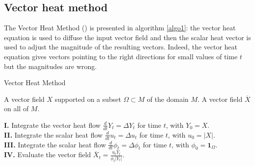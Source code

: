 \documentclass[sigconf, nonacm]{acmart}
\begin{document}
\subsection{Vector heat method}
The Vector Heat Method (\cite{Sharp:2019:VHM}) is presented in algorithm \ref{algo1}: the vector heat equation is used to diffuse the input vector field and then the scalar heat vector is used to adjust the magnitude of the resulting vectors. Indeed, the vector heat equation gives vectors pointing to the right directions for small values of time $t$ but the magnitudes are wrong. 

\begin{algorithm}
\caption{Vector Heat Method} \label{algo1}
\begin{algorithmic}
\Require A vector field $X$ supported on a subset $\Omega \subset M$ of the domain $M$.
\Ensure A vector field $\overline{X}$ on all of $M$.

\noindent \textbf{I.} Integrate the vector heat flow $\frac{d}{dt} Y_t = \Delta Y_t$ for time $t$, with $Y_0 = X$. \\

\textbf{II.} Integrate the scalar heat flow $\frac{d}{dt} u_t = \Delta u_t$ for time $t$, with $u_0 = |X|$. \\

\textbf{III.} Integrate the scalar heat flow $\frac{d}{dt} \phi_t = \Delta \phi_t$ for time $t$, with $\phi_0 = \mathbf{1}_{\Omega}$. \\

\textbf{IV.} Evaluate the vector field $\overline{X}_t = \frac{u_t Y_t}{\phi_t |Y_t|}$.
\end{algorithmic}
\end{algorithm}
\end{document}
